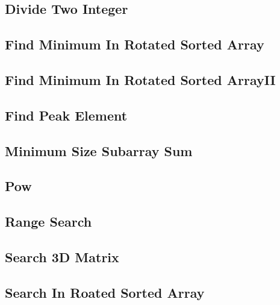 \documentclass[a4paper,10pt]{article}
\begin{document}
\begin{CJK}{UTF8}{gbsn}     %

\else

\subsection{Divide Two Integer}


\subsection{Find Minimum In Rotated Sorted Array}


\subsection{Find Minimum In Rotated Sorted ArrayII}


\subsection{Find Peak Element}


\subsection{Minimum Size Subarray Sum}


\subsection{Pow}


\subsection{Range Search}


\subsection{Search 3D Matrix}


\subsection{Search In Roated Sorted Array}



\end{CJK}
\end{document}
